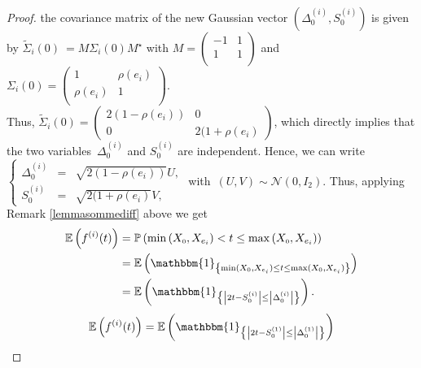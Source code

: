 \documentclass[12pt]{article}
\renewcommand{\tilde}{\widetilde}
\theoremstyle{Theorem}
\begin{document}
\begin{proof}
the covariance matrix of the new Gaussian vector $\left(\Delta^{\scriptscriptstyle (i)}_{\scriptscriptstyle 0}, S^{\scriptscriptstyle (i)}_{\scriptscriptstyle 0}\right)$ is given by ${\tilde{\Sigma}_{i}(0)~= M\Sigma_{i}(0) M^{\star}}$ with {\small $M = \begin{pmatrix}
-1 & 1 \\
1 & 1  \\
\end{pmatrix}$} and $\Sigma_{i}(0) = \begin{pmatrix} 1 & \rho(e_i) \\
\rho(e_i) & 1  \\ 
\end{pmatrix}.$ \\
Thus, $\tilde{\Sigma}_{i}(0) = \begin{pmatrix}  2(1-\rho(e_i)) & 0 \\ 0 & 2(1+\rho(e_i)  \end{pmatrix}$, which directly  implies that the two variables~$\Delta^{\scriptscriptstyle (i)}_{\scriptscriptstyle 0}$ and $S^{\scriptscriptstyle (i)}_{\scriptscriptstyle 0}$ are independent. Hence, we can write
$\left\{
 \begin{array}{rlc}
  \Delta^{\scriptscriptstyle (i)}_{\scriptscriptstyle 0} & = & \sqrt{2(1-\rho(e_i))}U, \\
  S^{\scriptscriptstyle (i)}_{\scriptscriptstyle 0} & = & \sqrt{2(1+\rho(e_i)}V, 
\end{array}
\right.$ \linebreak with~$(U, V) \sim \mathcal{N}\left(0, I_{2}\right)$. Thus, applying Remark \ref{lemmasommediff} above we get 
{\small
\begin{align*}
\mathbb{E}\left(f^{(i)}(t)\right) & = \mathbb{P}\left(\min\left(X_{\scriptscriptstyle 0}, X_{e_i}\right) < t \leq \max\left(X_{\scriptscriptstyle 0}, X_{e_i}\right)\right) \\
& = \mathbb{E}\left(\mathbbm{1}_{\left\{\min(X_{\scriptscriptstyle 0}, X_{e_i}) \leq t \leq \max(X_{\scriptscriptstyle 0}, X_{e_i})\right\}}\right) \\
& = \mathbb{E}\left(\mathbbm{1}_{\left\{ \left|2t - S^{\scriptscriptstyle (i)}_{\scriptscriptstyle 0}\right| \leq \left|\Delta^{\scriptscriptstyle (i)}_{\scriptscriptstyle 0}\right|\right\}}\right).
\end{align*}}
{\small
\begin{align*}
\mathbb{E}\left(f^{(i)}(t)\right) & = \mathbb{E}\left(\mathbbm{1}_{\left\{ \left|2t - S^{\scriptscriptstyle (1)}_{\scriptscriptstyle 0}\right| \leq \left|\Delta^{\scriptscriptstyle (1)}_{\scriptscriptstyle 0}\right|\right\}}\right) \\

\end{align*}}
\end{proof}
\end{document}
